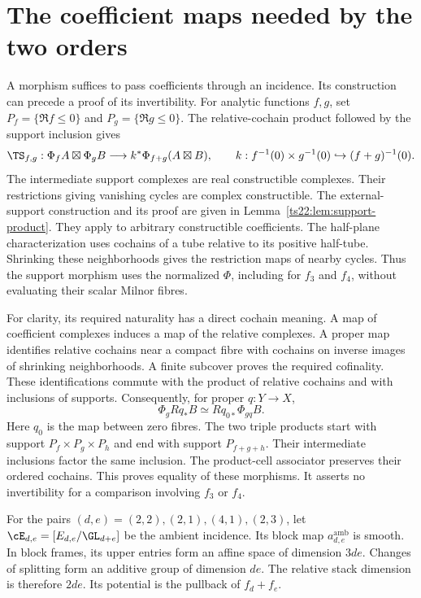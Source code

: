 \section{The coefficient maps needed by the two orders}
\label{fl221:sec:coefficient}

A morphism suffices to pass coefficients through an incidence.
Its construction can precede a proof of its invertibility.
For analytic functions $f,g$, set
$P_f=\{\Re f\le0\}$ and $P_g=\{\Re g\le0\}$.
The relative-cochain product followed by the support inclusion gives
\[
 \TS_{f,g}:\Phi_fA\boxtimes\Phi_gB
 \longrightarrow k^*\Phi_{f+g}(A\boxtimes B),\qquad
 k:f^{-1}(0)\times g^{-1}(0)\hookrightarrow(f+g)^{-1}(0).
\]
The intermediate support complexes are real constructible complexes.
Their restrictions giving vanishing cycles are complex constructible.
The external-support construction and its proof are given in
Lemma~\ref{ts22:lem:support-product}. They apply to arbitrary
constructible coefficients. The half-plane characterization uses
cochains of a tube relative to its positive half-tube. Shrinking
these neighborhoods gives the restriction maps of nearby cycles.
Thus the support morphism uses the normalized $\Phi$, including
for $f_3$ and $f_4$, without evaluating their scalar Milnor fibres.

For clarity, its required naturality has a direct cochain meaning.
A map of coefficient complexes induces a map of the relative
complexes. A proper map identifies relative cochains near a compact
fibre with cochains on inverse images of shrinking neighborhoods.
A finite subcover proves the required cofinality. These identifications
commute with the product of relative cochains and with inclusions
of supports. Consequently, for proper $q:Y\to X$,
\[
 \Phi_gRq_*B\simeq Rq_{0*}\Phi_{gq}B.
\]
Here $q_0$ is the map between zero fibres.
The two triple products start with support
$P_f\times P_g\times P_h$ and end with support $P_{f+g+h}$.
Their intermediate inclusions factor the same inclusion.
The product-cell associator preserves their ordered cochains.
This proves equality of these morphisms. It asserts no invertibility
for a comparison involving $f_3$ or $f_4$.

For the pairs $(d,e)=(2,2),(2,1),(4,1),(2,3)$, let
$\cE_{d,e}=[E_{d,e}/\GL_{d+e}]$ be the ambient incidence.
Its block map $a^{\mathrm{amb}}_{d,e}$ is smooth. In block frames,
its upper entries form an affine space of dimension $3de$.
Changes of splitting form an additive group of dimension $de$.
The relative stack dimension is therefore $2de$. Its potential is
the pullback of $f_d+f_e$.

